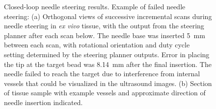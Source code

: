 \begin{figure}[!t]
\centerline{
\hfil
{}}
\caption[Closed-loop needle steering results; failed steering trial]{Closed-loop needle steering results. Example of failed needle steering: (a) Orthogonal views of successive incremental scans during needle steering in \textit{ex vivo} tissue, with the output from the steering planner after each scan below. The needle base was inserted 5~mm between each scan, with rotational orientation and duty cycle setting determined by the steering planner outputs. Error in placing the tip at the target bead was 8.14~mm after the final insertion. The needle failed to reach the target due to interference from internal vessels that could  be visualized in the ultrasound images. (b) Section of tissue sample with example vessels and approximate direction of needle insertion indicated.}
\label{fig:FailedSteering}
\end{figure}

